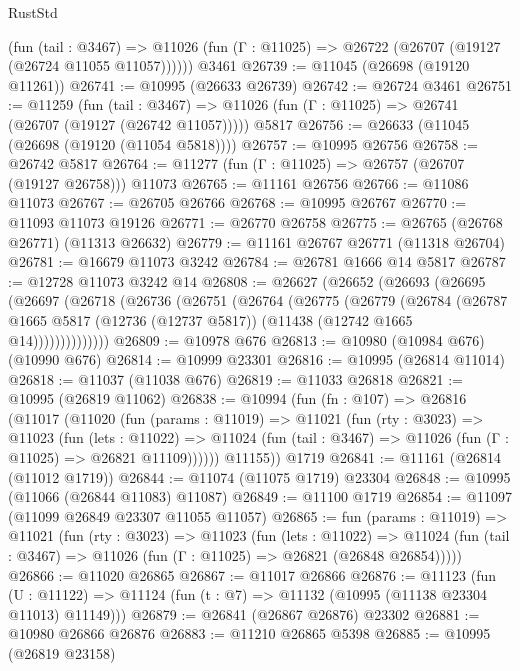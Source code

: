 \begin{lexlean}{RustStd}
\begin{coremodule}
      (fun (tail : @3467) =>
      @11026 (fun (Γ : @11025) => @26722 (@26707 (@19127 (@26724 @11055 @11057))))))
    @3461
@26739 := @11045 (@26698 (@19120 @11261))
@26741 := @10995 (@26633 @26739)
@26742 := @26724 @3461
@26751 := @11259
    (fun (tail : @3467) => @11026 (fun (Γ : @11025) => @26741 (@26707 (@19127 (@26742 @11057)))))
    @5817
@26756 := @26633 (@11045 (@26698 (@19120 (@11054 @5818))))
@26757 := @10995 @26756
@26758 := @26742 @5817
@26764 := @11277 (fun (Γ : @11025) => @26757 (@26707 (@19127 @26758))) @11073
@26765 := @11161 @26756
@26766 := @11086 @11073
@26767 := @26705 @26766
@26768 := @10995 @26767
@26770 := @11093 @11073 @19126
@26771 := @26770 @26758
@26775 := @26765 (@26768 @26771) (@11313 @26632)
@26779 := @11161 @26767 @26771 (@11318 @26704)
@26781 := @16679 @11073 @3242
@26784 := @26781 @1666 @14 @5817
@26787 := @12728 @11073 @3242 @14
@26808 := @26627
    (@26652
      (@26693
        (@26695
          (@26697
            (@26718
              (@26736
                (@26751
                  (@26764
                    (@26775
                      (@26779
                        (@26784
                          (@26787
                            @1665
                            @5817
                            (@12736 (@12737 @5817))
                            (@11438 (@12742 @1665 @14))))))))))))))
@26809 := @10978 @676
@26813 := @10980 (@10984 @676) (@10990 @676)
@26814 := @10999 @23301
@26816 := @10995 (@26814 @11014)
@26818 := @11037 (@11038 @676)
@26819 := @11033 @26818
@26821 := @10995 (@26819 @11062)
@26838 := @10994
    (fun (fn : @107) =>
    @26816
      (@11017
        (@11020
          (fun (params : @11019) =>
          @11021
            (fun (rty : @3023) =>
            @11023
              (fun (lets : @11022) =>
              @11024 (fun (tail : @3467) => @11026 (fun (Γ : @11025) => @26821 @11109))))))
        @11155))
    @1719
@26841 := @11161 (@26814 (@11012 @1719))
@26844 := @11074 (@11075 @1719) @23304
@26848 := @10995 (@11066 (@26844 @11083) @11087)
@26849 := @11100 @1719
@26854 := @11097 (@11099 @26849 @23307 @11055 @11057)
@26865 := fun (params : @11019) =>
  @11021
    (fun (rty : @3023) =>
    @11023
      (fun (lets : @11022) =>
      @11024 (fun (tail : @3467) => @11026 (fun (Γ : @11025) => @26821 (@26848 @26854)))))
@26866 := @11020 @26865
@26867 := @11017 @26866
@26876 := @11123
    (fun (U : @11122) => @11124 (fun (t : @7) => @11132 (@10995 (@11138 @23304 @11013) @11149)))
@26879 := @26841 (@26867 @26876) @23302
@26881 := @10980 @26866 @26876
@26883 := @11210 @26865 @5398
@26885 := @10995 (@26819 @23158)

\end{coremodule}
\end{lexlean}
